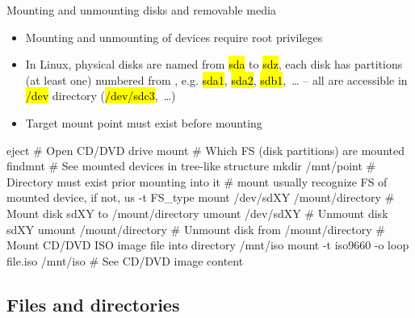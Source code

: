 \documentclass[compress, ucs, xelatex, 11pt, xcolor=svgnames,
  hyperref={
    bookmarks=true,
    unicode=true,
    colorlinks=true,
    pdftitle={Linux, command line and MetaCentrum},
    plainpages=false,
    pdfauthor={Vojtech Zeisek},
    pdfsubject={Course about use of Linux command line, writing shell scripts and using MetaCentrum of CESNET},
    pdfcreator={XeLaTeX},
    pdfkeywords={Linux, GNU, BASH, shell, command line, MetaCentrum},
    linkcolor=DarkRed,
    anchorcolor=DarkBlue,
    citecolor=Indigo,
    filecolor=NavyBlue,
    menucolor=DarkMagenta,
    urlcolor=DarkBlue,
    pdftex},
  url={hyphens, lowtilde} %
  ]{beamer}
\renewcommand{\texttt}[1]{\hl{\ttfamily #1}}
\begin{document}
\begin{frame}[fragile]{Mounting and unmounting disks and removable media}
  \begin{itemize}
    \item Mounting and unmounting of devices require root privileges
    \item In Linux, physical disks are named from \texttt{sda} to \texttt{sdz}, each disk has partitions (at least one) numbered from \texttt{1}, e.g. \texttt{sda1}, \texttt{sda2}, \texttt{sdb1},~\ldots{ }-- all are accessible in \texttt{/dev} directory (\texttt{/dev/sdc3},~\ldots)
    \item Target mount point must exist before mounting
  \end{itemize}
  \begin{bashcode}
    eject # Open CD/DVD drive
    mount # Which FS (disk partitions) are mounted
    findmnt # See mounted devices in tree-like structure
    mkdir /mnt/point # Directory must exist prior mounting into it
    # mount usually recognize FS of mounted device, if not, us -t FS_type
    mount /dev/sdXY /mount/directory # Mount disk sdXY to /mount/directory
    umount /dev/sdXY # Unmount disk sdXY
    umount /mount/directory # Unmount disk from /mount/directory
    # Mount CD/DVD ISO image file into directory /mnt/iso
    mount -t iso9660 -o loop file.iso /mnt/iso # See CD/DVD image content
  \end{bashcode}
\end{frame}

\subsection{Files and directories}
\end{document}
